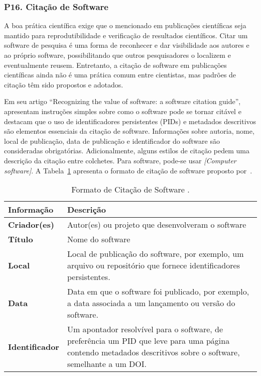 \subsubsection*{P16. Citação de Software} 

A boa prática científica exige que o \RSw mencionado em publicações científicas seja mantido para reprodutibilidade e verificação de resultados científicos.
%
Citar um software de pesquisa é uma forma de reconhecer e dar visibilidade aos autores e ao próprio software, possibilitando que outros pesquisadores o localizem e eventualmente reusem. Entretanto, 
a citação de software em publicações científicas ainda não é uma prática comum entre cientistas, mas padrões de citação têm sido propostos e adotados. 

Em seu artigo ``Recognizing the value of software: a software citation guide'',  \cite{katz:citation:format} apresentam instruções simples sobre como o software pode se tornar citável e destacam que o uso de identificadores persistentes (PIDs) e metadados descritivos são elementos essenciais da citação de software. 
Informações sobre autoria, nome, local de publicação, data de publicação e identificador do software são consideradas obrigatórias.
%
Adicionalmente, alguns estilos de citação pedem uma descrição da citação entre colchetes. Para software, pode-se usar \textit{[Computer software]}.
A Tabela~\ref{tab:citation:format} apresenta o formato de citação de software proposto por~\cite{katz:citation:format}.

\begin{table}[htb]
    \centering
        \caption{Formato de Citação de Software \cite{katz:citation:format}.}
    \label{tab:citation:format}
    \begin{tabular}{p{2.5cm}|p{11.5cm}}
    \hline
        \textbf{Informação} & \textbf{Descrição} \\
    \hline
        \textbf{Criador(es)} & Autor(es) ou projeto que desenvolveram o software \\
        \textbf{Título} & Nome do software \\
        \textbf{Local} & Local de publicação do software, por exemplo, um arquivo ou repositório que fornece identificadores persistentes. \\
        \textbf{Data} & Data em que o software foi publicado, por exemplo, a data associada a um lançamento ou versão do software.\\
        \textbf{Identificador} &  Um apontador resolvível para o software,  de preferência um PID que leve para uma página contendo metadados descritivos sobre o software, semelhante a um DOI. \\
    \hline
    \end{tabular}
\end{table}

